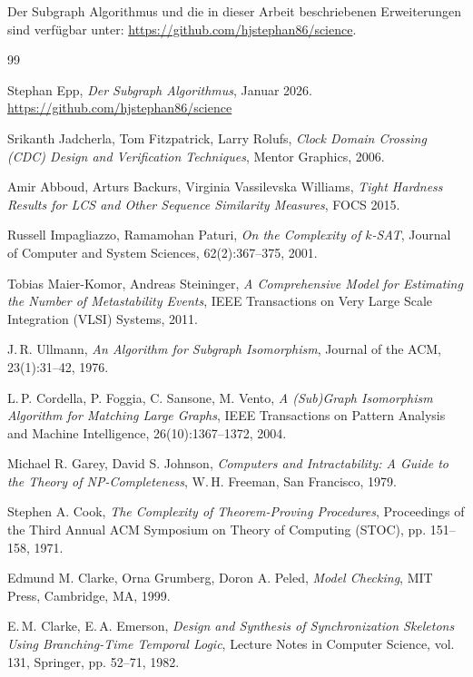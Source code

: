 ﻿\documentclass[a4paper,12pt]{article}
\theoremstyle{definition}
\begin{document}
	Der Subgraph Algorithmus und die in dieser Arbeit beschriebenen
	Erweiterungen sind verf\"ugbar unter:
	\url{https://github.com/hjstephan86/science}.
	
	\begin{thebibliography}{99}
		
		Stephan Epp,
		\textit{Der Subgraph Algorithmus}, Januar 2026.
		\url{https://github.com/hjstephan86/science}
		
		Srikanth Jadcherla, Tom Fitzpatrick, Larry Rolufs,
		\textit{Clock Domain Crossing (CDC) Design and Verification Techniques},
		Mentor Graphics, 2006.
		
		Amir Abboud, Arturs Backurs, Virginia Vassilevska Williams,
		\textit{Tight Hardness Results for LCS and Other Sequence Similarity Measures},
		FOCS 2015.
		
		Russell Impagliazzo, Ramamohan Paturi,
		\textit{On the Complexity of $k$-SAT},
		Journal of Computer and System Sciences, 62(2):367--375, 2001.
		
		Tobias Maier-Komor, Andreas Steininger,
		\textit{A Comprehensive Model for Estimating the Number of Metastability Events},
		IEEE Transactions on Very Large Scale Integration (VLSI) Systems, 2011.

		J.\,R. Ullmann,
		\textit{An Algorithm for Subgraph Isomorphism},
		Journal of the ACM, 23(1):31--42, 1976.

		L.\,P. Cordella, P. Foggia, C. Sansone, M. Vento,
		\textit{A (Sub)Graph Isomorphism Algorithm for Matching Large Graphs},
		IEEE Transactions on Pattern Analysis and Machine Intelligence,
		26(10):1367--1372, 2004.

		Michael R. Garey, David S. Johnson,
		\textit{Computers and Intractability: A Guide to the Theory of NP-Completeness},
		W.\,H. Freeman, San Francisco, 1979.

		Stephen A. Cook,
		\textit{The Complexity of Theorem-Proving Procedures},
		Proceedings of the Third Annual ACM Symposium on Theory of Computing (STOC),
		pp. 151--158, 1971.

		Edmund M. Clarke, Orna Grumberg, Doron A. Peled,
		\textit{Model Checking},
		MIT Press, Cambridge, MA, 1999.

		E.\,M. Clarke, E.\,A. Emerson,
		\textit{Design and Synthesis of Synchronization Skeletons Using Branching-Time
		Temporal Logic},
		Lecture Notes in Computer Science, vol. 131, Springer, pp. 52--71, 1982.


\end{thebibliography}
\end{document}

